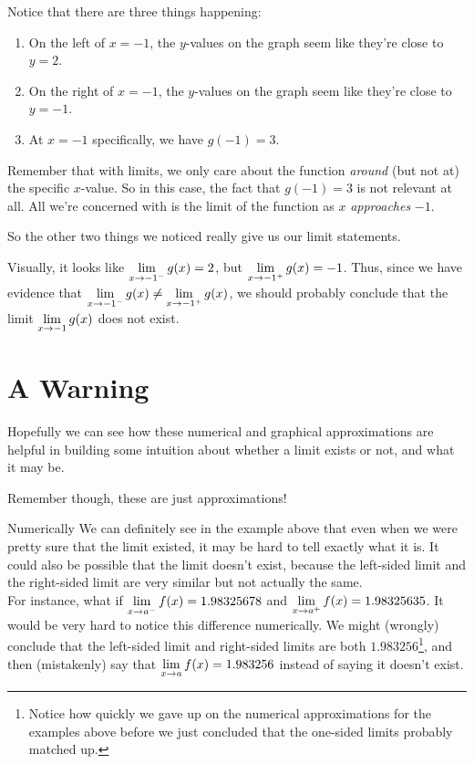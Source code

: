 Notice that there are three things happening:
\begin{enumerate}
  \item On the left of $x=-1$, the $y$-values on the graph seem like they're close to $y=2$.
  \item On the right of $x=-1$, the $y$-values on the graph seem like they're close to $y=-1$.
  \item At $x=-1$ specifically, we have $g(-1)=3$.
\end{enumerate}

Remember that with limits, we only care about the function \textit{around} (but not at) the specific $x$-value.
So in this case, the fact that $g(-1)=3$ is not relevant at all.
All we're concerned with is the limit of the function as $x$ \textit{approaches} $-1$.

So the other two things we noticed really give us our limit statements.

Visually, it looks like $\displaystyle \lim_{x\to -1^-} g(x) = 2$, but $\displaystyle \lim_{x\to -1^+} g(x) = -1$. Thus, since we have evidence that $\displaystyle \lim_{x\to -1^-} g(x) \neq \displaystyle \lim_{x\to -1^+} g(x)$, we should probably conclude that the limit $\displaystyle \lim_{x\to -1} g(x)$ does not exist.

\section*{A Warning}

Hopefully we can see how these numerical and graphical approximations are helpful in building some intuition about whether a limit exists or not, and what it may be.

Remember though, these are just approximations!
\begin{describe}{Numerically}
  We can definitely see in the example above that even when we were pretty sure that the limit existed, it may be hard to tell exactly what it is.
  It could also be possible that the limit doesn't exist, because the left-sided limit and the right-sided limit are very similar but not actually the same.\\

  For instance, what if $\displaystyle \lim_{x\to a^-} f(x) = 1.98325678$ and $\displaystyle \lim_{x\to a^+} f(x) = 1.98325635$.
  It would be very hard to notice this difference numerically.
  We might (wrongly) conclude that the left-sided limit and right-sided limits are both $1.983256$\footnote{Notice how quickly we gave up on the numerical approximations for the examples above before we just concluded that the one-sided limits probably matched up.}, and then (mistakenly) say that $\displaystyle \lim_{x\to a} f(x)=1.983256$ instead of saying it doesn't exist.
\end{describe}

